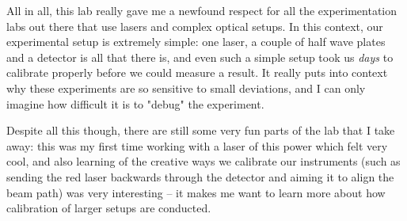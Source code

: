 \documentclass[10pt]{article}
\begin{document}
	All in all, this lab really gave me a newfound respect for all the experimentation labs out there that
	use lasers and complex optical setups. In this context, our experimental setup is extremely simple: one
	laser, a couple of half wave plates and a detector is all that there is, and even such a simple setup
	took us \textit{days} to calibrate properly before we could measure a result. It really puts into context
	why these experiments are so sensitive to small deviations, and I can only imagine how difficult it is to
	"debug" the experiment. 

	Despite all this though, there are still some very fun parts of the lab that I take away: this was my
	first time working with a laser of this power which felt very cool, and also learning of the creative
	ways we calibrate our instruments (such as sending the red laser backwards through the detector and
	aiming it to align the beam path) was very interesting -- it makes me want to learn more about how
	calibration of larger setups are conducted.      
	 

	\nocite{*}
	\printbibliography
\end{document}
